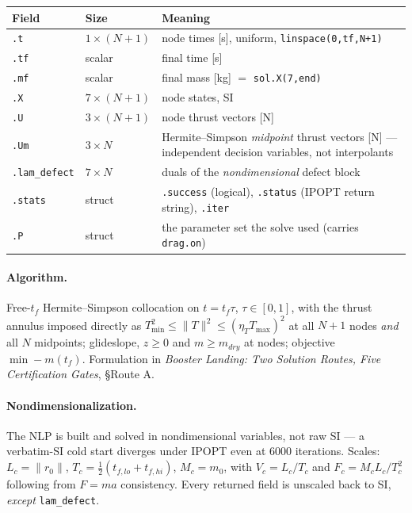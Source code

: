 \documentclass[11pt]{article}
\newcommand{\thenote}{\emph{Booster Landing: Two Solution Routes, Five
Certification Gates}}
\newcommand{\noteS}[1]{\thenote, \S#1}
\newcommand{\Tmax}{T_{\max}}
\newcommand{\etaT}{\eta_T}
\begin{document}
\begin{center}
\begin{tabular}{@{}llL{7.4cm}@{}}
\toprule
Field & Size & Meaning \\
\midrule
\texttt{.t}  & $1\times(N{+}1)$ & node times [s], uniform,
  \texttt{linspace(0,tf,N+1)} \\
\texttt{.tf} & scalar & final time [s] \\
\texttt{.mf} & scalar & final mass [kg] $=$ \texttt{sol.X(7,end)} \\
\texttt{.X}  & $7\times(N{+}1)$ & node states, SI \\
\texttt{.U}  & $3\times(N{+}1)$ & node thrust vectors [N] \\
\texttt{.Um} & $3\times N$ & Hermite--Simpson \emph{midpoint} thrust vectors
  [N] --- independent decision variables, not interpolants \\
\texttt{.lam\_defect} & $7\times N$ & duals of the \emph{nondimensional}
  defect block \\
\texttt{.stats} & struct & \texttt{.success} (logical),
  \texttt{.status} (IPOPT return string), \texttt{.iter} \\
\texttt{.P} & struct & the parameter set the solve used (carries
  \texttt{drag.on}) \\
\bottomrule
\end{tabular}
\end{center}

\paragraph{Algorithm.} Free-$t_f$ Hermite--Simpson collocation on
$t = t_f\tau$, $\tau\in[0,1]$, with the thrust annulus imposed directly as
$T_{\min}^2 \le \lVert T\rVert^2 \le (\etaT\Tmax)^2$ at all $N{+}1$ nodes
\emph{and} all $N$ midpoints; glideslope, $z\ge0$ and $m\ge m_{dry}$ at
nodes; objective $\min -m(t_f)$. Formulation in \noteS{Route A}.

\paragraph{Nondimensionalization.} The NLP is built and solved in
nondimensional variables, not raw SI --- a verbatim-SI cold start diverges
under IPOPT even at 6000 iterations. Scales: $L_c = \lVert r_0\rVert$,
$T_c = \tfrac12(t_{f,lo}+t_{f,hi})$, $M_c = m_0$, with
$V_c = L_c/T_c$ and $F_c = M_cL_c/T_c^2$ following from $F=ma$
consistency. Every returned field is unscaled back to SI, \emph{except}
\texttt{lam\_defect}.
\end{document}
